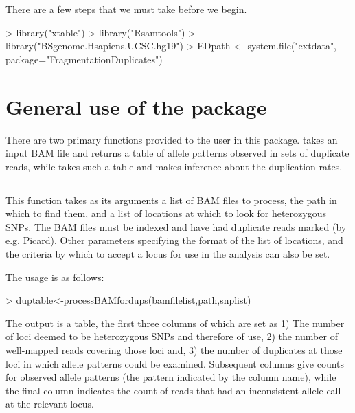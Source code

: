 \documentclass{article}
\begin{document}
There are a few steps that we must take before we begin.

\begin{Schunk}
\begin{Sinput}
> library("xtable")
> library("Rsamtools")
> library("BSgenome.Hsapiens.UCSC.hg19")
> EDpath <- system.file("extdata", package="FragmentationDuplicates")
\end{Sinput}
\end{Schunk}

\clearpage{}

\section{General use of the package}

There are two primary functions provided to the user in this package.  takes an input BAM file and returns a table of allele patterns observed in sets of duplicate reads, while  takes such a table and makes inference about the duplication rates.

\subsection{}

This function takes as its arguments a list of BAM files to process, the path in which to find them, and a list of locations at which to look for heterozygous SNPs. The BAM files must be indexed and have had duplicate reads marked (by e.g. Picard). Other parameters specifying the format of the list of locations, and the criteria by which to accept a locus for use in the analysis can also be set.

The usage is as follows:

\begin{Schunk}
\begin{Sinput}
> duptable<-processBAMfordups(bamfilelist,path,snplist)
\end{Sinput}
\end{Schunk}

The output is a table, the first three columns of which are set as 1) The number of loci deemed to be heterozygous SNPs and therefore of use, 2) the number of well-mapped reads covering those loci and, 3) the number of duplicates at those loci in which allele patterns could be examined.  Subsequent columns give counts for observed allele patterns (the pattern indicated by the column name), while the final column indicates the count of reads that had an inconsistent allele call at the relevant locus.
\end{document}
